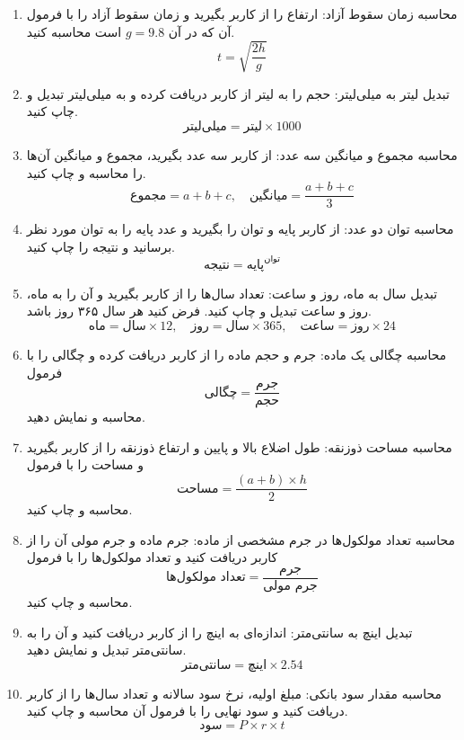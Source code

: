 \documentclass[b5paper,12pt]{article}
\begin{document}
\begin{enumerate}
		\item محاسبه زمان سقوط آزاد: ارتفاع را از کاربر بگیرید و زمان سقوط آزاد را با فرمول آن که در آن \(g=9.8\) است محاسبه کنید.
		\[
		t = \sqrt{\frac{2h}{g}}
		\]
		
		\item تبدیل لیتر به میلی‌لیتر: حجم را به لیتر از کاربر دریافت کرده و به میلی‌لیتر تبدیل و چاپ کنید.
		\[
		\text{میلی‌لیتر} = \text{لیتر} \times 1000
		\]
		
		\item محاسبه مجموع و میانگین سه عدد: از کاربر سه عدد بگیرید، مجموع و میانگین آن‌ها را محاسبه و چاپ کنید.
		\[
		\text{مجموع} = a + b + c, \quad \text{میانگین} = \frac{a + b + c}{3}
		\]
		
		\item محاسبه توان دو عدد: از کاربر پایه و توان را بگیرید و عدد پایه را به توان مورد نظر برسانید و نتیجه را چاپ کنید.
		\[
		\text{نتیجه} = \text{پایه}^{\text{توان}}
		\]
		
		\item تبدیل سال به ماه، روز و ساعت: تعداد سال‌ها را از کاربر بگیرید و آن را به ماه، روز و ساعت تبدیل و چاپ کنید. فرض کنید هر سال ۳۶۵ روز باشد.
		\[
		\text{ماه} = \text{سال} \times 12, \quad \text{روز} = \text{سال} \times 365, \quad \text{ساعت} = \text{روز} \times 24
		\]
		
		\item محاسبه چگالی یک ماده: جرم و حجم ماده را از کاربر دریافت کرده و چگالی را با فرمول
		\[
		\text{چگالی} = \frac{\text{جرم}}{\text{حجم}}
		\]
		محاسبه و نمایش دهید.
		
		\item محاسبه مساحت ذوزنقه: طول اضلاع بالا و پایین و ارتفاع ذوزنقه را از کاربر بگیرید و مساحت را با فرمول
		\[
		\text{مساحت} = \frac{(a + b) \times h}{2}
		\]
		محاسبه و چاپ کنید.
		
		\item محاسبه تعداد مولکول‌ها در جرم مشخصی از ماده: جرم ماده و جرم مولی آن را از کاربر دریافت کنید و تعداد مولکول‌ها را با فرمول
		\[
		\text{تعداد مولکول‌ها} = \frac{\text{جرم}}{\text{جرم مولی}}
		\]
		محاسبه و چاپ کنید.
		
		\item تبدیل اینچ به سانتی‌متر: اندازه‌ای به اینچ را از کاربر دریافت کنید و آن را به سانتی‌متر تبدیل و نمایش دهید.
		\[
		\text{سانتی‌متر} = \text{اینچ} \times 2.54
		\]
		
		\item محاسبه مقدار سود بانکی: مبلغ اولیه، نرخ سود سالانه و تعداد سال‌ها را از کاربر دریافت کنید و سود نهایی را با فرمول آن محاسبه و چاپ کنید.
		\[
		\text{سود} = P \times r \times t
		\]
		
	\end{enumerate}
	
\end{document}
